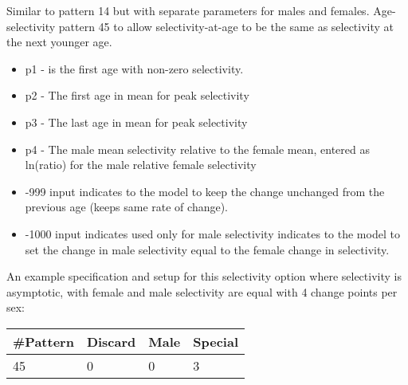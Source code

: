 Similar to pattern 14 but with separate parameters for males and females. Age-selectivity pattern 45 to allow selectivity-at-age to be the same as selectivity at the next younger age.  
	\begin{itemize}
		\item p1 - is the first age with non-zero selectivity.
		\item p2 - The first age in mean for peak selectivity
		\item p3 - The last age in mean for peak selectivity
		\item p4 - The male mean selectivity relative to the female mean, entered as ln(ratio) for the male relative female selectivity
		\item -999 input indicates to the model to keep the change unchanged from the previous age (keeps same rate of change).
		\item -1000 input indicates used only for male selectivity indicates to the model to set the change in male selectivity equal to the female change in selectivity.
	\end{itemize}
		
An example specification and setup for this selectivity option where selectivity is asymptotic, with female and male selectivity are equal with 4 change points per sex:
	\begin{center}
		\begin{longtable}{p{1.5cm} p{1.5cm} p{1.5cm} p{1.5cm} }
			\hline
			\#Pattern & Discard & Male & Special\Tstrut\Bstrut\\
			\hline
			45 & 0 & 0 & 3 \Tstrut\Bstrut\\
			\hline
		\end{longtable}
	\end{center}
		

